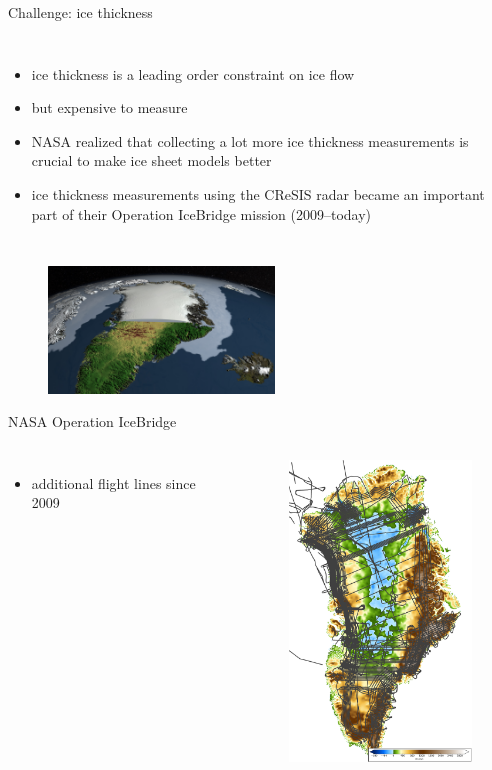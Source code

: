\documentclass[hide notes,intlimits]{beamer}
\begin{document}
\begin{frame}{Challenge: ice thickness}
\begin{columns}
    \column[c]{10cm}
    \begin{itemize}
    \item ice thickness is a leading order constraint on ice flow
    \item but expensive to measure
    \item NASA realized that collecting a lot more ice thickness measurements is crucial to make ice sheet models better
    \item ice thickness measurements using the CReSIS radar became an important part of their Operation IceBridge mission (2009--today)
    \end{itemize}
  \end{columns}
  \begin{figure}
    \includegraphics[width=6cm]{canale_grande_V05}
  \end{figure}
\end{frame}


\begin{frame}{NASA Operation IceBridge}
  \vspace{-0.74em}
  \begin{columns}
    \column[c]{4cm}
    \begin{itemize}
    \item additional flight lines since 2009
    \end{itemize}
    \column[c]{6cm}
    \begin{figure}
      \includegraphics[height=8cm]{greenland-bed-old-oib}
    \end{figure}
  \end{columns}
\end{frame}
\end{document}
